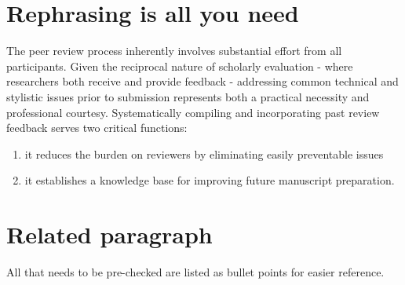 \documentclass[acmsmall,screen,review]{acmart}
\begin{document}



\maketitle

\section{Rephrasing is all you need}
The peer review process inherently involves substantial effort from all participants. Given the reciprocal nature of scholarly evaluation - where researchers both receive and provide feedback - addressing common technical and stylistic issues prior to submission represents both a practical necessity and professional courtesy. Systematically compiling and incorporating past review feedback serves two critical functions:
\begin{enumerate}
    \item it reduces the burden on reviewers by eliminating easily preventable issues
    \item it establishes a knowledge base for improving future manuscript preparation.
\end{enumerate}

\section{Related paragraph}
All that needs to be pre-checked are listed as bullet points for easier reference.
\end{document}
